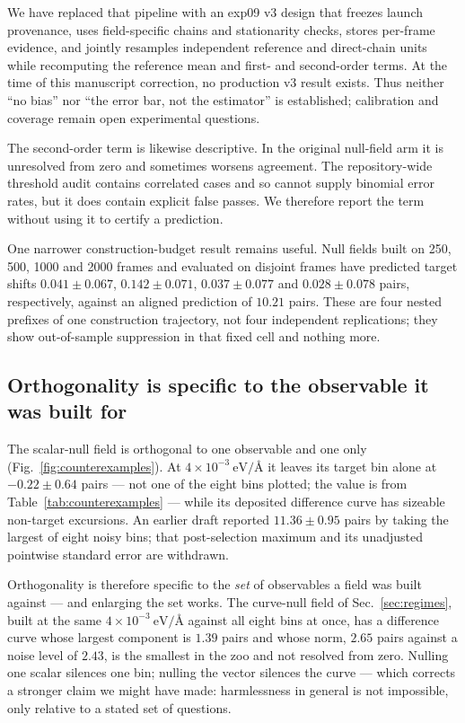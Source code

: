 \documentclass[aip,jcp,reprint,amsmath,amssymb,floatfix]{revtex4-2}
\newcommand{\eVA}{\ensuremath{\mathrm{eV}/\text{\AA}}}
\begin{document}
We have replaced that pipeline with an exp09 v3 design that freezes launch provenance,
uses field-specific chains and stationarity checks, stores per-frame evidence,
and jointly resamples independent reference and direct-chain units while
recomputing the reference mean and first- and second-order terms. At the time of
this manuscript correction, no production v3 result exists. Thus neither ``no
bias'' nor ``the error bar, not the estimator'' is established; calibration and
coverage remain open experimental questions.

The second-order term is likewise descriptive. In the original null-field arm
it is unresolved from zero and sometimes worsens agreement. The repository-wide
threshold audit contains correlated cases and so cannot supply binomial error
rates, but it does contain explicit false passes. We therefore report the term
without using it to certify a prediction.

One narrower construction-budget result remains useful. Null fields built on
250, 500, 1000 and 2000 frames and evaluated on disjoint frames have predicted
target shifts $0.041\pm0.067$, $0.142\pm0.071$, $0.037\pm0.077$ and
$0.028\pm0.078$ pairs, respectively, against an aligned prediction of
$10.21$ pairs. These are four nested prefixes of one construction trajectory,
not four independent replications; they show out-of-sample suppression in that
fixed cell and nothing more.

\subsection{Orthogonality is specific to the observable it was built for}
\label{sec:orthogonality}

The scalar-null field is orthogonal to one observable and one only
(Fig.~\ref{fig:counterexamples}). At $4\times10^{-3}~\eVA$ it leaves its target
bin alone at $-0.22 \pm 0.64$ pairs --- not one of the eight bins
plotted; the value is from Table~\ref{tab:counterexamples} --- while its
deposited difference curve has sizeable non-target excursions. An earlier draft
reported $11.36 \pm 0.95$ pairs by taking the largest of eight noisy bins; that
post-selection maximum and its unadjusted pointwise standard error are
withdrawn.

Orthogonality is therefore specific to the \emph{set} of observables a field
was built against --- and enlarging the set works. The curve-null field of
Sec.~\ref{sec:regimes}, built at the same $4\times10^{-3}~\eVA$ against all
eight bins at once, has a difference curve whose largest component is
$1.39$ pairs and whose norm, $2.65$ pairs against a noise level of $2.43$, is
the smallest in the zoo and not resolved from zero. Nulling one
scalar silences one bin; nulling the vector silences the curve --- which
corrects a stronger claim we might have made: harmlessness in general is not
impossible, only relative to a stated set of questions.
\end{document}
